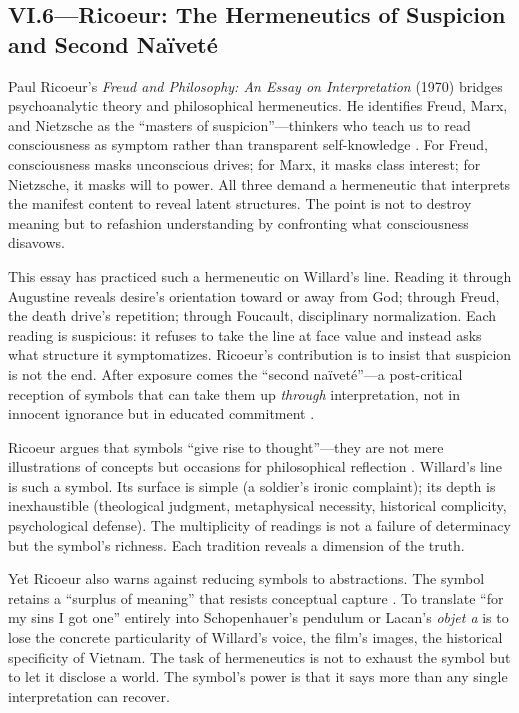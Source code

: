 \subsection*{VI.6—Ricoeur: The Hermeneutics of Suspicion and Second Naïveté}
\label{ssec:vi-ricoeur}

Paul Ricoeur's \textit{Freud and Philosophy: An Essay on Interpretation} (1970) bridges 
psychoanalytic theory and philosophical hermeneutics. He identifies Freud, Marx, and Nietzsche 
as the ``masters of suspicion''---thinkers who teach us to read consciousness as symptom 
rather than transparent self-knowledge \parencite{RicoeurSymbol1970}. For Freud, consciousness 
masks unconscious drives; for Marx, it masks class interest; for Nietzsche, it masks will to 
power. All three demand a hermeneutic that interprets the manifest content to reveal latent 
structures. The point is not to destroy meaning but to refashion understanding by confronting 
what consciousness disavows.

This essay has practiced such a hermeneutic on Willard's line. Reading it through Augustine 
reveals desire's orientation toward or away from God; through Freud, the death drive's 
repetition; through Foucault, disciplinary normalization. Each reading is suspicious: it 
refuses to take the line at face value and instead asks what structure it symptomatizes. 
Ricoeur's contribution is to insist that suspicion is not the end. After exposure comes the 
``second naïveté''---a post-critical reception of symbols that can take them up 
\emph{through} interpretation, not in innocent ignorance but in educated commitment 
\parencite{RicoeurSymbol1970}.

Ricoeur argues that symbols ``give rise to thought''---they are not mere illustrations of 
concepts but occasions for philosophical reflection \parencite[p.~347]{RicoeurSymbol1970}. 
Willard's line is such a symbol. Its surface is simple (a soldier's ironic complaint); its 
depth is inexhaustible (theological judgment, metaphysical necessity, historical complicity, 
psychological defense). The multiplicity of readings is not a failure of determinacy but the 
symbol's richness. Each tradition reveals a dimension of the truth.

Yet Ricoeur also warns against reducing symbols to abstractions. The symbol retains a 
``surplus of meaning'' that resists conceptual capture \parencite{RicoeurSymbol1970}. To 
translate ``for my sins I got one'' entirely into Schopenhauer's pendulum or Lacan's 
\emph{objet a} is to lose the concrete particularity of Willard's voice, the film's images, 
the historical specificity of Vietnam. The task of hermeneutics is not to exhaust the symbol 
but to let it disclose a world. The symbol's power is that it says more than any single 
interpretation can recover.

